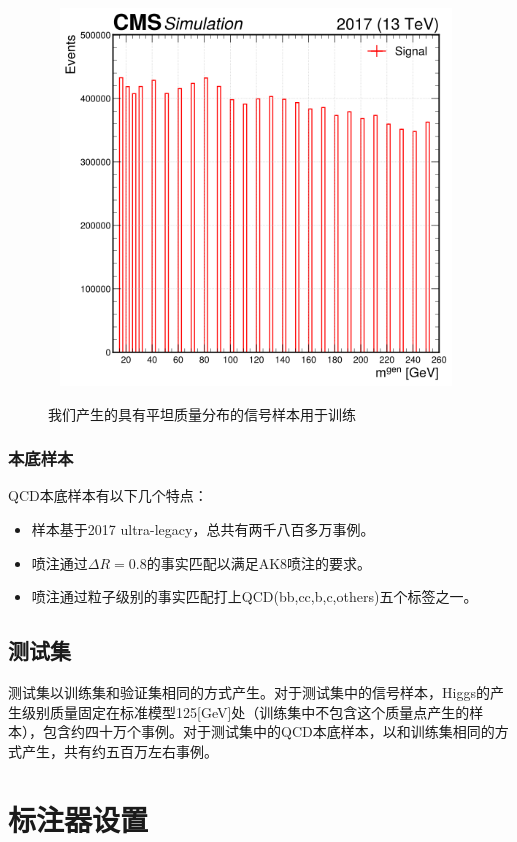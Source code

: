\begin{figure}[H]
 \centering
 \caption{我们产生的具有平坦质量分布的信号样本用于训练}
 \includegraphics[height=10cm, width=11cm]{pictures/gen_mass.png}
 \label{fig:gen_mass}
\end{figure}


\subsubsection{本底样本}
QCD本底样本有以下几个特点：
\begin{itemize}
    \item 样本基于2017 ultra-legacy，总共有两千八百多万事例。
    \item 喷注通过$\Delta R=0.8$的事实匹配以满足AK8喷注的要求。
    \item 喷注通过粒子级别的事实匹配打上QCD(bb,cc,b,c,others)五个标签之一。
\end{itemize}
\subsection{测试集}
测试集以训练集和验证集相同的方式产生。对于测试集中的信号样本，Higgs的产生级别质量固定在标准模型125[GeV]处（训练集中不包含这个质量点产生的样本），包含约四十万个事例。对于测试集中的QCD本底样本，以和训练集相同的方式产生，共有约五百万左右事例。


\section{标注器设置}
